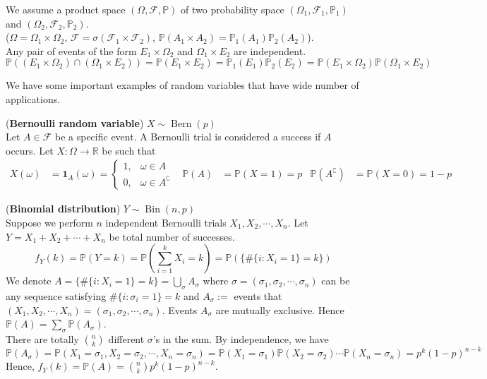 \documentclass{huhtakm-template-book}
\newcommand{\prob}{\mathbb{P}}
\DeclareMathOperator{\Bern}{Bern}
\DeclareMathOperator{\Bin}{Bin}
\begin{document}
    \begin{rem}
        We assume a product space $(\Omega,\mathcal{F},\prob)$ of two probability space $(\Omega_{1},\mathcal{F}_{1},\prob_{1})$ and $(\Omega_{2},\mathcal{F}_{2},\prob_{2})$.\\
        ($\Omega=\Omega_{1}\times\Omega_{2}$, $\mathcal{F}=\sigma(\mathcal{F}_{1}\times\mathcal{F}_{2})$, $\prob(A_{1}\times A_{2})=\prob_{1}(A_{1})\prob_{2}(A_{2})$).\\
        Any pair of events of the form $E_{1}\times\Omega_{2}$ and $\Omega_{1}\times E_{2}$ are independent.
        \begin{equation*}
            \prob((E_{1}\times\Omega_{2})\cap(\Omega_{1}\times E_{2}))=\prob(E_{1}\times E_{2})=\prob_{1}(E_{1})\prob_{2}(E_{2})=\prob(E_{1}\times\Omega_{2})\prob(\Omega_{1}\times E_{2})
        \end{equation*}
    \end{rem}
    We have some important examples of random variables that have wide number of applications.
    \begin{eg}(\textbf{Bernoulli random variable}) $X\sim \Bern(p)$\\
        Let $A\in\mathcal{F}$ be a specific event. A Bernoulli trial is considered a success if $A$ occurs. Let $X:\Omega\to\mathbb{R}$ be such that
        \begin{align*}
            X(\omega)&=\mathbf{1}_{A}(\omega)=\begin{cases}
                1, &\omega\in A\\
                0, &\omega\in A^{\complement}
            \end{cases} & \prob(A)&=\prob(X=1)=p & \prob(A^{\complement})&=\prob(X=0)=1-p
        \end{align*}
    \end{eg}
    \begin{eg}(\textbf{Binomial distribution}) $Y\sim\Bin(n,p)$\\
        Suppose we perform $n$ independent Bernoulli trials $X_{1},X_{2},\cdots,X_{n}$. Let $Y=X_{1}+X_{2}+\cdots+X_{n}$ be total number of successes.
        \begin{equation*}
            f_{Y}(k)=\prob(Y=k)=\prob\left(\sum_{i=1}^{k}X_{i}=k\right)=\prob(\{\#\{i:X_{i}=1\}=k\})
        \end{equation*}
        We denote $A=\{\#\{i:X_{i}=1\}=k\}=\bigcup_{\sigma}A_{\sigma}$ where $\sigma=(\sigma_{1},\sigma_{2},\cdots,\sigma_{n})$ can be any sequence satisfying $\#\{i:\sigma_{i}=1\}=k$ and $A_{\sigma}:=$ events that $(X_{1},X_{2},\cdots,X_{n})=(\sigma_{1},\sigma_{2},\cdots,\sigma_{n})$. Events $A_{\sigma}$ are mutually exclusive. Hence $\prob(A)=\sum_{\sigma}\prob(A_{\sigma})$.\\
        There are totally $\binom{n}{k}$ different $\sigma$'s in the sum. By independence, we have
        \begin{equation*}
            \prob(A_{\sigma})=\prob(X_{1}=\sigma_{1},X_{2}=\sigma_{2},\cdots,X_{n}=\sigma_{n})=\prob(X_{1}=\sigma_{1})\prob(X_{2}=\sigma_{2})\cdots\prob(X_{n}=\sigma_{n})=p^{k}(1-p)^{n-k}
        \end{equation*}
        Hence, $f_{Y}(k)=\prob(A)=\binom{n}{k}p^{k}(1-p)^{n-k}$.
    \end{eg}
\end{document}
